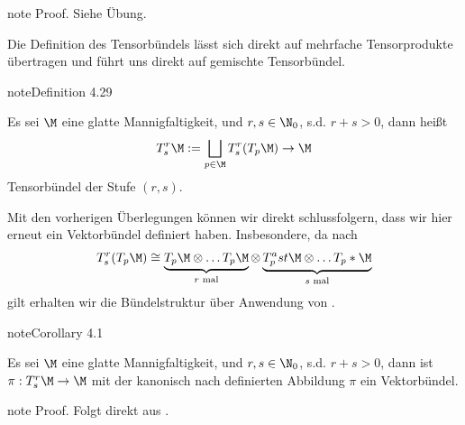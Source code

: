 \documentclass[letterpaper,10pt,german]{jupyterBook}
\begin{document}
\begin{sphinxadmonition}{note}
\sphinxAtStartPar
Proof. Siehe Übung.
\end{sphinxadmonition}

\sphinxAtStartPar
Die Definition des Tensorbündels lässt sich direkt auf mehrfache Tensorprodukte übertragen und führt uns direkt auf gemischte Tensorbündel.
\label{manifolds/tangential:definition-43}
\begin{sphinxadmonition}{note}{Definition 4.29}



\sphinxAtStartPar
Es sei \(\M\) eine glatte Mannigfaltigkeit, und \(r,s\in\N_0\), s.d. \(r+s>0\), dann heißt
\begin{equation*}
\begin{split}T^r_s\M := \bigsqcup_{p\in\M} T^r_s(T_p\M) \to \M\end{split}
\end{equation*}
\sphinxAtStartPar
Tensorbündel der Stufe \((r,s)\).
\end{sphinxadmonition}

\sphinxAtStartPar
Mit den vorherigen Überlegungen können wir direkt schlussfolgern, dass wir hier erneut ein Vektorbündel definiert haben. Insbesondere, da nach {\hyperref[\detokenize{vektoranalysis/tensor:cor:tensorMultilinearform}]{}}
\begin{equation*}
\begin{split}T^r_s(T_p\M) \cong \underbrace{T_p\M\otimes\ldots T_p\M}_{r\text{ mal}}\otimes\underbrace{T_p^ast\M\otimes\ldots T_p\ast\M}_{s\text{ mal}}\end{split}
\end{equation*}
\sphinxAtStartPar
gilt erhalten wir die Bündelstruktur über Anwendung von {\hyperref[\detokenize{manifolds/tangential:lem:tensorbundle}]{}}.
\label{manifolds/tangential:corollary-44}
\begin{sphinxadmonition}{note}{Corollary 4.1}



\sphinxAtStartPar
Es sei \(\M\) eine glatte Mannigfaltigkeit, und \(r,s\in\N_0\), s.d. \(r+s>0\), dann ist \(\pi:T^r_s\M\to\M\) mit der kanonisch nach {\hyperref[\detokenize{manifolds/tangential:lem:tensorbundle}]{}} definierten Abbildung \(\pi\) ein Vektorbündel.
\end{sphinxadmonition}

\begin{sphinxadmonition}{note}
\sphinxAtStartPar
Proof. Folgt direkt aus {\hyperref[\detokenize{manifolds/tangential:lem:tensorbundle}]{}}.
\end{sphinxadmonition}
\end{document}
